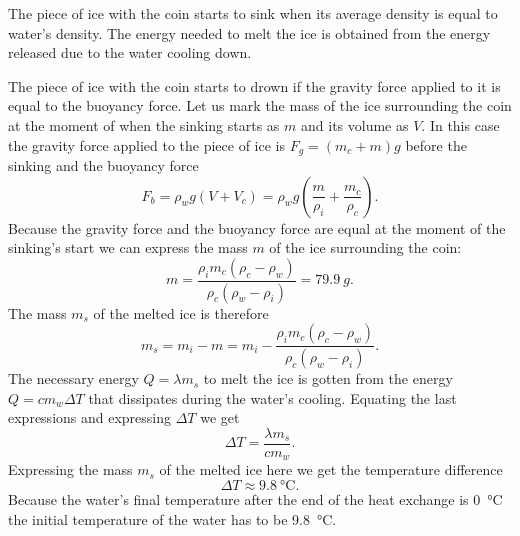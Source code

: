 \hinteng
The piece of ice with the coin starts to sink when its average density is equal to water’s density. The energy needed to melt the ice is obtained from the energy released due to the water cooling down.

\solueng
The piece of ice with the coin starts to drown if the gravity force applied to it is equal to the buoyancy force. Let us mark the mass of the ice surrounding the coin at the moment of when the sinking starts as $m$ and its volume as $V$. In this case the gravity force applied to the piece of ice is $F_g=(m_c+m)g$ before the sinking and the buoyancy force 
\[ F_b=\rho_w g(V + V_c)=\rho_w g\left(\frac{m}{\rho_i} + \frac{m_c}{\rho_c}\right). \]
Because the gravity force and the buoyancy force are equal at the moment of the sinking's start we can express the mass $m$ of the ice surrounding the coin:
\[ m = \frac{\rho_i m_c(\rho_c - \rho_w)}{\rho_c(\rho_w - \rho_i)} = \SI{79,9}{g}. \] 
The mass $m_s$ of the melted ice is therefore
\[ m_s = m_i - m = m_i - \frac{\rho_i m_c(\rho_c - \rho_w)}{\rho_c(\rho_w - \rho_i)}. \]
The necessary energy $Q=\lambda m_s$ to melt the ice is gotten from the energy $Q=cm_w\Delta T$ that dissipates during the water's cooling. Equating the last expressions and expressing $\Delta T$ we get 
\[ \Delta  T = \frac{\lambda m_s}{cm_w}. \] 
Expressing the mass $m_s$ of the melted ice here we get the temperature difference
\[ \Delta T \approx \SI{9,8}{\degreeCelsius}. \] 
Because the water's final temperature after the end of the heat exchange is \SI{0}{\degreeCelsius} the initial temperature of the water has to be \SI{9,8}{\degreeCelsius}.
\probend